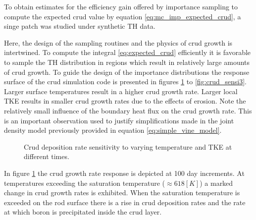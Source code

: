 To obtain estimates for the efficiency gain offered by importance sampling to compute the expected crud value by equation \ref{eq:mc_imp_expected_crud}, a singe patch was studied under synthetic TH data.

Here, the design of the sampling routines and the physics of crud growth is intertwined.  To compute the integral \ref{eq:expected_crud} efficiently it is favorable to sample the TH distribution in regions which result in relatively large amounts of crud growth.  To guide the design of the importance distributions the response surface of the crud simulation code is presented in figures \ref{fig:crud_sensi1} to \ref{fig:crud_sensi3}.  Larger surface temperatures result in a higher crud growth rate.  Larger local TKE results in smaller crud growth rates due to the effects of erosion.  Note the relatively small influence of the boundary heat flux on the crud growth rate.  This is an important observation used to justify simplifications made in the joint density model previously provided in equation \ref{eq:simple_vine_model}.

\begin{figure}[H]%
    \captionsetup[subfigure]{justification=centering}
    \centering
    \hspace*{-1.0em}%
    \caption[Crud marginal response to varying temperature and TKE at different times.]{Crud deposition rate sensitivity to varying temperature and TKE at different times.}%
    \label{fig:crud_sensi1}%
\end{figure}

In figure \ref{fig:crud_sensi1} the crud growth rate response is depicted at 100 day increments.  At temperatures exceeding the saturation temperature ($\approx 618[K]$) a marked change in crud growth rates is exhibited.  When the saturation temperature is exceeded on the rod surface there is a rise in crud deposition rates and the rate at which boron is precipitated inside the crud layer.

